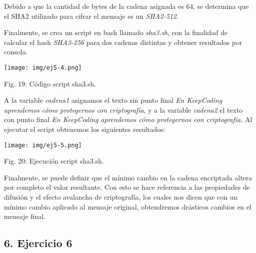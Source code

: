 \documentclass[12pt,oneside,a4paper]{book}
\newcommand{\newsection}[1]{{\subsection*{#1}
\addcontentsline{toc}{section}{#1}}}
\begin{document}
\newpage

Debido a que la cantidad de bytes de la cadena asignada es 64, se determina que el SHA2 utilizado para cifrar el mensaje es un \textit{SHA2-512}.

\vspace{1em}

\hspace{20pt}
Finalmente, se crea un script en bash llamado \textit{sha3.sh}, con la finalidad de calcular el hash \textit{SHA3-256} para dos cadenas distintas y obtener resultados por consola.

\vspace{2em}

\begin{center}
    \texttt{[image: img/ej5-4.png]}
    
\vspace{0.1em}
    
    Fig. 19: Código script sha3.sh.
\end{center}

\vspace{2em}

A la variable \textit{cadena1} asignamos el texto sin punto final \textit{En KeepCoding aprendemos cómo protegernos con criptografía}, y a la variable \textit{cadena2} el texto con punto final \textit{En KeepCoding aprendemos cómo protegernos con criptografía.} Al ejecutar el script obtenemos los siguientes resultados:

\vspace{2em}

\begin{center}
    \texttt{[image: img/ej5-5.png]}
    
\vspace{0.1em}
    
    Fig. 20: Ejecución script sha3.sh.
\end{center}

\vspace{2em}

\hspace{20pt}
Finalmente, se puede definir que el mínimo cambio en la cadena encriptada altera por completo el valor resultante. Con esto se hace referencia a las propiedades de difusión y el efecto avalancha de criptografía, los cuales nos dicen que con un mínimo cambio aplicado al mensaje original, obtendremos drásticos cambios en el mensaje final.

\newpage

\newsection{6. Ejercicio 6}
\end{document}

